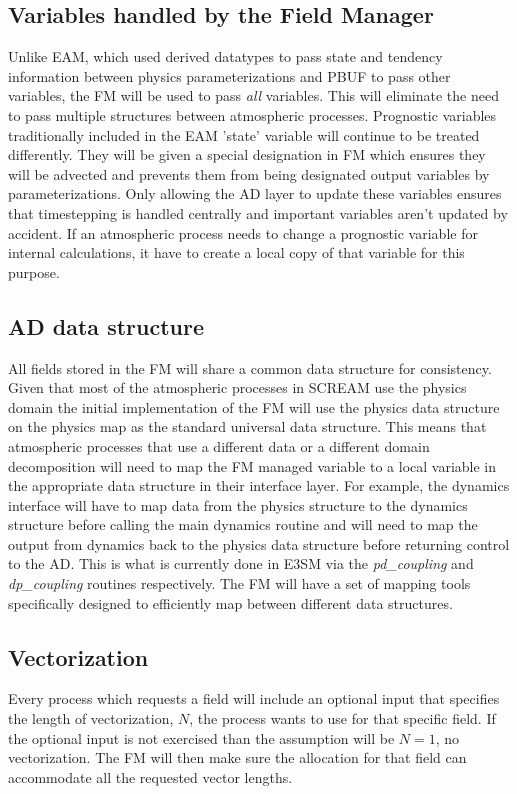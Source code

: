 \documentclass[10pt]{article}
\begin{document}
\subsection{Variables handled by the Field Manager}
Unlike EAM, which used derived datatypes to pass state and tendency information between physics parameterizations and PBUF to pass other variables, the FM will be used to pass \emph{all} variables.  This will eliminate the need to pass multiple structures between atmospheric processes.  Prognostic variables traditionally included in the EAM 'state' variable will continue to be treated differently. They will be given a special designation in FM which ensures they will be advected and prevents them from being designated output variables by parameterizations. Only allowing the AD layer to update these variables ensures that timestepping is handled centrally and important variables aren't updated by accident. If an atmospheric process needs to change a prognostic variable for internal calculations, it have to create a local copy of that variable for this purpose.

\subsection{AD data structure}
All fields stored in the FM will share a common data structure for consistency.  Given that most of the atmospheric processes in SCREAM use the physics domain the initial implementation of the FM will use the physics data structure on the physics map as the standard universal data structure.  This means that atmospheric processes that use a different data  or a different domain decomposition will need to map the FM managed variable to a local variable in the appropriate data structure in their interface layer.  For example, the dynamics interface will have to map data from the physics structure to the dynamics structure before calling the main dynamics routine and will need to map the output from dynamics back to the physics data structure before returning control to the AD.   This is what is currently done in E3SM via the \emph{pd\_coupling} and \emph{dp\_coupling} routines respectively.  The FM will have a set of mapping tools specifically designed to efficiently map between different data structures.

\subsection{Vectorization}
Every process which requests a field will include an optional input that specifies the length of vectorization, $N$, the process wants to use for that specific field.  If the optional input is not exercised than the assumption will be $N=1$, no vectorization.  The FM will then make sure the allocation for that field can accommodate all the requested vector lengths.
\end{document}
